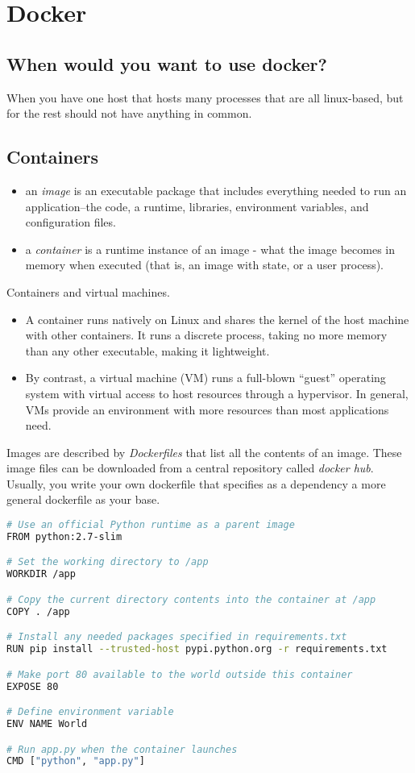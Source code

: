 \section{Docker}

\subsection{When would you want to use docker?}
When you have one host that hosts many processes that are all linux-based, but for the rest should not have anything in common. 

\subsection{Containers}

\begin{itemize}
    \item an \emph{image} is an executable package that includes everything needed to run an application--the code, a runtime, libraries, environment variables, and configuration files.
    \item a \emph{container} is a runtime instance of an image - what the image becomes in memory when executed (that is, an image with state, or a user process).
\end{itemize}


Containers and virtual machines.
\begin{itemize}
    \item A container runs natively on Linux and shares the kernel of the host machine with other containers. It runs a discrete process, taking no more memory than any other executable, making it lightweight.
    \item By contrast, a virtual machine (VM) runs a full-blown “guest” operating system with virtual access to host resources through a hypervisor. In general, VMs provide an environment with more resources than most applications need.
\end{itemize}

Images are described by \emph{Dockerfiles} that list all the contents of an image. These image files can be downloaded from a central repository called \emph{docker hub}.
Usually, you write your own dockerfile that specifies as a dependency a more general dockerfile as your base. 

\begin{lstlisting}[language=bash]
# Use an official Python runtime as a parent image
FROM python:2.7-slim

# Set the working directory to /app
WORKDIR /app

# Copy the current directory contents into the container at /app
COPY . /app

# Install any needed packages specified in requirements.txt
RUN pip install --trusted-host pypi.python.org -r requirements.txt

# Make port 80 available to the world outside this container
EXPOSE 80

# Define environment variable
ENV NAME World

# Run app.py when the container launches
CMD ["python", "app.py"]
\end{lstlisting}


